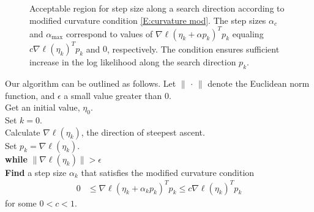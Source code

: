 \begin{figure}[h]
\centering
    \scalebox{.4}{}
	\caption[Acceptable region for step size $\alpha$ along search 
direction $p$ according to modified curvature condition]{Acceptable region for step size 
along a search direction according to modified curvature condition 
\eqref{E:curvature mod}. The step sizes $\alpha_{c}$ and $\alpha_{\textrm{max}}$ 
correspond to values of $\nabla \ell( \eta_k + \alpha p_k)^T p_k$ equaling 
$c \nabla \ell(\eta_k)^T p_k$ and $0$, 
respectively.  The condition ensures sufficient increase in the log likelihood along 
the search direction $p_k$.}
\label{F:alpha_region}
\end{figure}
 



Our algorithm can be outlined as follows.  Let $\lVert \, \cdot \, \rVert$ denote the 
Euclidean norm function, and $\epsilon$ 
a small value greater than 0.  \\

\noindent Get an initial value, $\eta_0$.\\ 
Set $k=0$. \\
Calculate $\nabla \ell( \eta_k)$, the direction of steepest ascent. \\
Set $p_k = \nabla \ell( \eta_k)$. \\
\textbf{while}  $\lVert \nabla \ell( \eta_k) \rVert > \epsilon$ \\ 
\hspace{4mm} \indent	 \textbf{Find} a step size $\alpha_k$ that satisfies the modified 
curvature condition
\begin{align*}
	 0 & \leq \nabla \ell( \eta_k + \alpha_k p_k)^T p_k \leq c \nabla \ell(\eta_k)^T 
p_k
\end{align*}
\indent for some $0 < c < 1$.  


